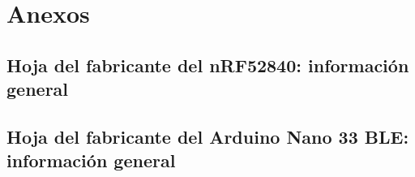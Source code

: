 \newpage
\section{Anexos}


\subsection{Hoja del fabricante del nRF52840: información general} \label{an:01_GEN}
\vspace{\fill}
 
\subsection{Hoja del fabricante del Arduino Nano 33 BLE: información general} \label{an:02_GEN}
\vspace{\fill}
 
